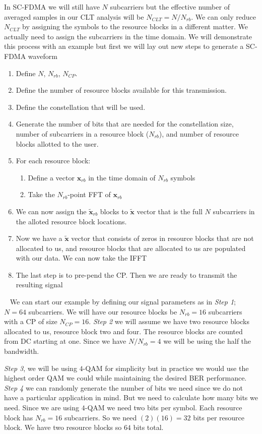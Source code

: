 In \ac{SC-FDMA} we will still have $N$ subcarriers but the effective number of averaged samples in our \ac{CLT} analysis will be $N_{CLT}=N/N_{rb}$. We can only reduce $N_{CLT}$ by assigning the symbols to the resource blocks in a different matter. We actually need to assign the subcarriers in the time domain. We will demonstrate this process with an example but first we will lay out new steps to generate a \ac{SC-FDMA} waveform

\begin{enumerate}
\item{Define $N$, $N_{rb}$, $N_{CP}$.}
\item{Define the number of resource blocks available for this transmission.}
\item{Define the constellation that will be used.}
\item{Generate the number of bits that are needed for the constellation size, number of subcarriers in a resource block ($N_{rb}$), and number of resource blocks allotted to the user.}
\item{For each resource block:}
 \begin{enumerate}
 \item{Define a vector $\mathbf{x}_{rb}$ in the time domain of $N_{rb}$ symbols}
 \item{Take the $N_{rb}$-point \ac{FFT} of $\mathbf{x}_{rb}$}
 \end{enumerate}
\item{We can now assign the $\tilde{\mathbf{x}}_{rb}$ blocks to $\tilde{\mathbf{x}}$ vector that is the full $N$ subcarriers in the alloted resource block locations.}
\item{Now we have a $\tilde{\mathbf{x}}$ vector that consists of zeros in resource blocks that are not allocated to us, and resource blocks that are allocated to us are populated with our data. We can now take the \ac{IFFT}} 
\item{The last step is to pre-pend the \ac{CP}. Then we are ready to transmit the resulting signal}
\end{enumerate}
 
We can start our example by defining our signal parameters as in \emph{Step 1}; $N=64$ subcarriers. We will have our resource blocks be $N_{rb} = 16$ subcarriers with a \ac{CP} of size $N_{CP}=16$. \emph{Step 2} we will assume we have two resource blocks allocated to us, resource block two and four. The resource blocks are counted from \ac{DC} starting at one. Since we have $N/N_{rb}=4$ we will be using the half the bandwidth.

\emph{Step 3}, we will be using $4$-\ac{QAM} for simplicity but in practice we would use the highest order \ac{QAM} we could while maintaining the desired \ac{BER} performance. \emph{Step 4} we can randomly generate the number of bits we need since we do not have a particular application in mind. But we need to calculate how many bits we need. Since we are using $4$-\ac{QAM} we need two bits per symbol. Each resource block has $N_{rb} = 16$ subcarriers. So we need $(2)(16)=32$ bits per resource block. We have two resource blocks so $64$ bits total.


